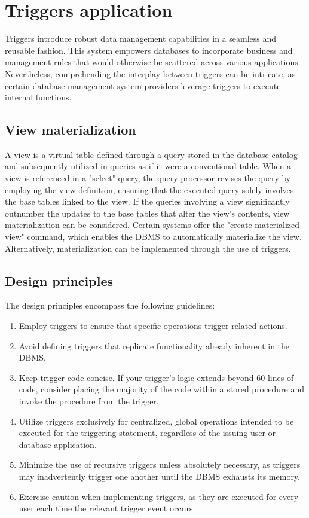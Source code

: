 \section{Triggers application}

Triggers introduce robust data management capabilities in a seamless and reusable fashion. 
This system empowers databases to incorporate business and management rules that would otherwise be scattered across various applications. 
Nevertheless, comprehending the interplay between triggers can be intricate, as certain database management system  providers leverage triggers to execute internal functions.

\subsection*{View materialization}
A view is a virtual table defined through a query stored in the database catalog and subsequently utilized in queries as if it were a conventional table. 
When a view is referenced in a "select" query, the query processor revises the query by employing the view definition, ensuring that the executed query solely involves the base tables linked to the view.   
If the queries involving a view significantly outnumber the updates to the base tables that alter the view's contents, view materialization can be considered.  
Certain systems offer the "create materialized view" command, which enables the DBMS to automatically materialize the view. 
Alternatively, materialization can be implemented through the use of triggers.

\subsection*{Design principles}
The design principles encompass the following guidelines:
\begin{enumerate}
    \item Employ triggers to ensure that specific operations trigger related actions.
    \item Avoid defining triggers that replicate functionality already inherent in the DBMS. 
    \item Keep trigger code concise. 
        If your trigger's logic extends beyond 60 lines of code, consider placing the majority of the code within a stored procedure and invoke the procedure from the trigger.
    \item Utilize triggers exclusively for centralized, global operations intended to be executed for the triggering statement, regardless of the issuing user or database application.
    \item Minimize the use of recursive triggers unless absolutely necessary, as triggers may inadvertently trigger one another until the DBMS exhausts its memory.
    \item Exercise caution when implementing triggers, as they are executed for every user each time the relevant trigger event occurs.
\end{enumerate}

